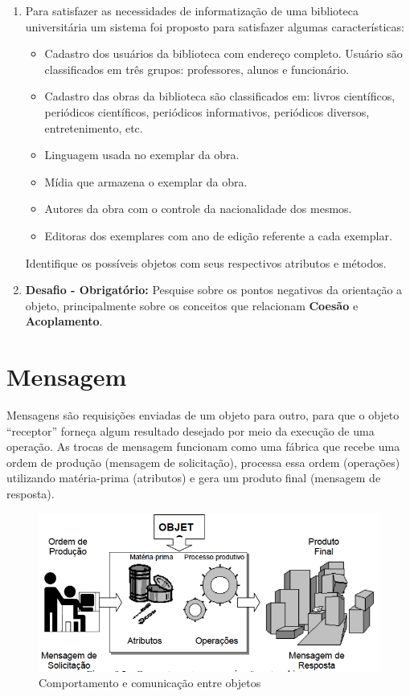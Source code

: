 \begin{enumerate}
    \item Para satisfazer as necessidades de informatização de uma biblioteca universitária um sistema foi proposto para satisfazer algumas características:

\begin{itemize}
  \item Cadastro dos usuários da biblioteca com endereço completo. 
  Usuário são classificados em três grupos: professores, alunos e funcionário.  
  \item Cadastro das obras da biblioteca são classificados em: livros científicos, periódicos científicos, periódicos informativos, periódicos diversos, entretenimento, etc.
  \item Linguagem usada no exemplar da obra.
  \item Mídia que armazena o exemplar da obra.
  \item Autores da obra com o controle da nacionalidade dos mesmos.
  \item Editoras dos exemplares com ano de edição referente a cada exemplar.
\end{itemize}

Identifique os possíveis objetos com seus respectivos atributos e métodos.

\item \textbf{Desafio - Obrigatório:} Pesquise sobre os pontos negativos da orientação a objeto, principalmente sobre os conceitos que relacionam \textbf{Coesão} e \textbf{Acoplamento}.
\end{enumerate}

\section{Mensagem}

Mensagens são requisições enviadas de um objeto para outro, para que o objeto ``receptor'' forneça algum resultado desejado por meio da execução de uma operação. As trocas de mensagem funcionam como uma fábrica que
recebe uma ordem de produção (mensagem de solicitação), processa essa ordem (operações) utilizando matéria-prima (atributos) e gera um produto final (mensagem de resposta).

\begin{figure}[H]
  \centering
  \includegraphics[scale=0.5]{imagens/analogia-mensagens.png}
  \caption{Comportamento e comunicação entre objetos}
  \label{}
\end{figure}

